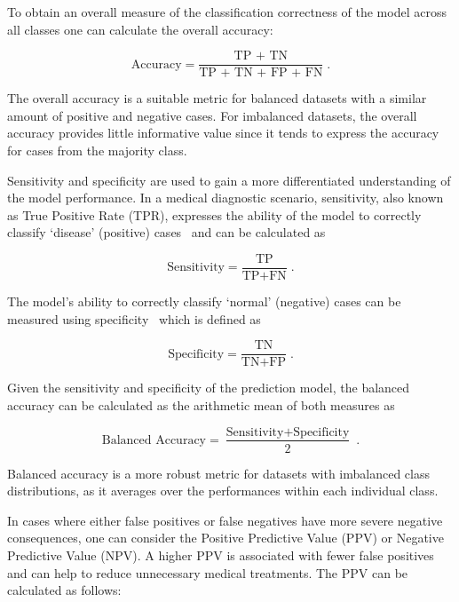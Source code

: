 To obtain an overall measure of the classification correctness of the model across all classes
one can calculate the overall accuracy:

\begin{equation}
  \label{eq:acc}
  \text{Accuracy} = \frac{\text{TP + TN}}{\text{TP + TN + FP + FN}} \;.
\end{equation}

The overall accuracy is a suitable metric for balanced datasets with a similar amount of positive and negative cases.
For imbalanced datasets, the overall accuracy provides little informative value 
since it tends to express the accuracy for cases from the majority class.

Sensitivity and specificity are used to gain a more differentiated understanding of the model performance.
In a medical diagnostic scenario, sensitivity, also known as True Positive Rate (TPR),
expresses the ability of the model to correctly classify `disease' (positive) cases~\citep{Parikh2008-ch} 
and can be calculated as

\begin{equation}
  \label{eq:sens}
  \text{Sensitivity} = \frac{\text{TP}}{\text{TP} + \text{FN}} \;.
\end{equation}

The model's ability to correctly classify `normal' (negative) cases can be measured using specificity~\citep{Parikh2008-ch} which is defined as

\begin{equation}
  \label{eq:spec}
  \text{Specificity} = \frac{\text{TN}}{\text{TN} + \text{FP}} \;.
\end{equation}

Given the sensitivity and specificity of the prediction model,
the balanced accuracy can be calculated as the arithmetic mean of both measures as

\begin{equation}
  \label{eq:bacc}
  \text{Balanced Accuracy} = \frac{\text{Sensitivity} + \text{Specificity}}{2} \;.
\end{equation}

Balanced accuracy is a more robust metric for datasets with imbalanced class distributions,
as it averages over the performances within each individual class.

In cases where either false positives or false negatives have more severe negative consequences,
one can consider the Positive Predictive Value (PPV) or Negative Predictive Value (NPV).
A higher PPV is associated with fewer false positives and can help to reduce unnecessary medical treatments.
The PPV can be calculated as follows:

